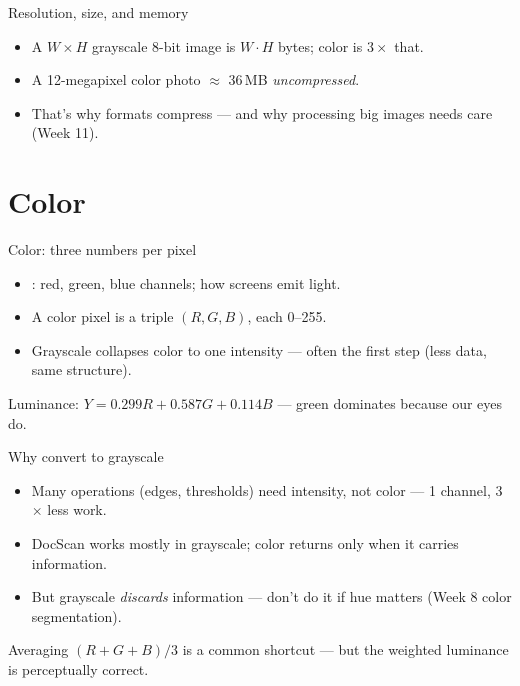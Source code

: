 \documentclass[10pt,aspectratio=169]{beamer}
\begin{document}
\begin{frame}{Resolution, size, and memory}
  \begin{itemize}
    \item A $W\times H$ grayscale 8-bit image is $W\cdot H$ bytes; color is $3\times$ that.
    \item A 12-megapixel color photo $\approx$ 36\,MB \emph{uncompressed}.
    \item That's why formats compress — and why processing big images needs care (Week 11).
  \end{itemize}
\end{frame}

\section{Color}

\begin{frame}{Color: three numbers per pixel}
  \begin{itemize}
    \item {}: red, green, blue channels; how screens emit light.
    \item A color pixel is a triple $(R,G,B)$, each 0--255.
    \item Grayscale collapses color to one intensity — often the first step (less data, same structure).
  \end{itemize}
  \begin{mathbox}
    Luminance: $Y = 0.299R + 0.587G + 0.114B$ — green dominates because our eyes do.
  \end{mathbox}
\end{frame}

\begin{frame}{Why convert to grayscale}
  \begin{itemize}
    \item Many operations (edges, thresholds) need intensity, not color — 1 channel, 3$\times$ less work.
    \item DocScan works mostly in grayscale; color returns only when it carries information.
    \item But grayscale \emph{discards} information — don't do it if hue matters (Week 8 color segmentation).
  \end{itemize}
  \begin{badbox}
    Averaging $(R+G+B)/3$ is a common shortcut — but the weighted luminance is perceptually correct.
  \end{badbox}
\end{frame}
\end{document}

